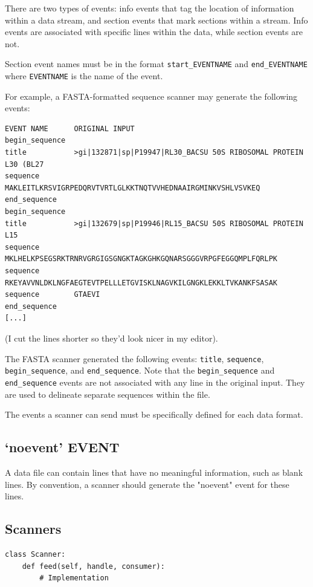 \documentclass{report}
\begin{document}
There are two types of events: info events that tag the location of
information within a data stream, and section events that mark
sections within a stream.  Info events are associated with specific
lines within the data, while section events are not.

Section event names must be in the format \verb|start_EVENTNAME| and
\verb|end_EVENTNAME| where \verb|EVENTNAME| is the name of the event.

For example, a FASTA-formatted sequence scanner may generate the
following events:
\begin{verbatim}
EVENT NAME      ORIGINAL INPUT
begin_sequence 
title           >gi|132871|sp|P19947|RL30_BACSU 50S RIBOSOMAL PROTEIN L30 (BL27
sequence        MAKLEITLKRSVIGRPEDQRVTVRTLGLKKTNQTVVHEDNAAIRGMINKVSHLVSVKEQ
end_sequence
begin_sequence
title           >gi|132679|sp|P19946|RL15_BACSU 50S RIBOSOMAL PROTEIN L15
sequence        MKLHELKPSEGSRKTRNRVGRGIGSGNGKTAGKGHKGQNARSGGGVRPGFEGGQMPLFQRLPK
sequence        RKEYAVVNLDKLNGFAEGTEVTPELLLETGVISKLNAGVKILGNGKLEKKLTVKANKFSASAK
sequence        GTAEVI
end_sequence
[...]
\end{verbatim}

(I cut the lines shorter so they'd look nicer in my editor).

The FASTA scanner generated the following events: \verb|title|, \verb|sequence|,
\verb|begin_sequence|, and \verb|end_sequence|.  Note that the \verb|begin_sequence|
and \verb|end_sequence| events are not associated with any line in the
original input.  They are used to delineate separate sequences within
the file.

The events a scanner can send must be specifically defined for each
data format.

\subsection{`noevent' EVENT}

A data file can contain lines that have no meaningful information,
such as blank lines.  By convention, a scanner should generate the
"noevent" event for these lines.

\subsection{Scanners}

\begin{verbatim}
class Scanner:
    def feed(self, handle, consumer):
        # Implementation
\end{verbatim}
\end{document}
